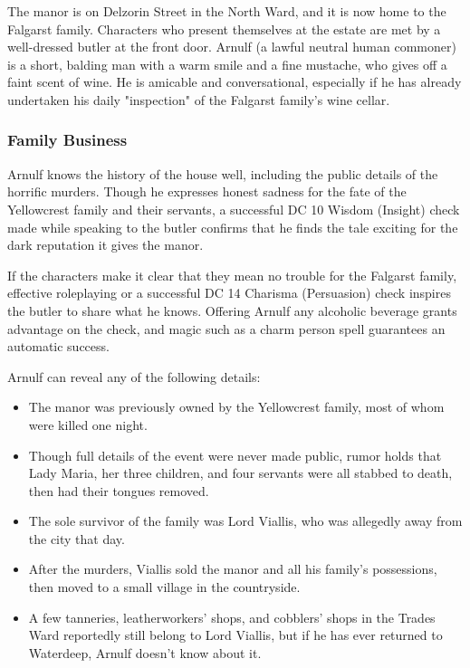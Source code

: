 \documentclass[10pt,a4paper,twoside,bg=print,twocolumn,openany,nodeprecatedcode]{dndbook}
\begin{document}
The manor is on Delzorin Street in the North Ward, and it is now home to the Falgarst family. Characters who present themselves at the estate are met by a well-dressed butler at the front door. Arnulf (a lawful neutral human commoner) is a short, balding man with a warm smile and a fine mustache, who gives off a faint scent of wine. He is amicable and conversational, especially if he has already undertaken his daily "inspection" of the Falgarst family's wine cellar.

\subsubsection{Family Business}
Arnulf knows the history of the house well, including the public details of the horrific murders. Though he expresses honest sadness for the fate of the Yellowcrest family and their servants, a successful DC 10 Wisdom (Insight) check made while speaking to the butler confirms that he finds the tale exciting for the dark reputation it gives the manor.

If the characters make it clear that they mean no trouble for the Falgarst family, effective roleplaying or a successful DC 14 Charisma (Persuasion) check inspires the butler to share what he knows. Offering Arnulf any alcoholic beverage grants advantage on the check, and magic such as a charm person spell guarantees an automatic success.

Arnulf can reveal any of the following details:


\begin{itemize}
\item The manor was previously owned by the Yellowcrest family, most of whom were killed one night.
\item Though full details of the event were never made public, rumor holds that Lady Maria, her three children, and four servants were all stabbed to death, then had their tongues removed.
\item The sole survivor of the family was Lord Viallis, who was allegedly away from the city that day.
\item After the murders, Viallis sold the manor and all his family's possessions, then moved to a small village in the countryside.
\item A few tanneries, leatherworkers' shops, and cobblers' shops in the Trades Ward reportedly still belong to Lord Viallis, but if he has ever returned to Waterdeep, Arnulf doesn't know about it.
\end{itemize}
\end{document}

